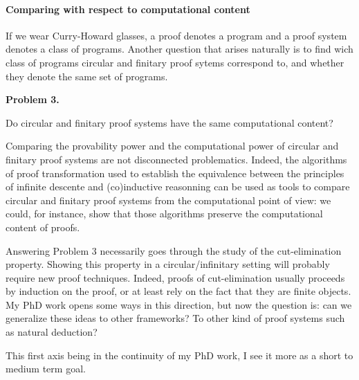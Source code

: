 \documentclass[11pt,twocolumn]{article}
\begin{document}
\paragraph{Comparing with respect to computational content}

If we wear Curry-Howard glasses, a proof denotes a program and a proof system denotes a class
of programs. Another question that arises naturally is to find wich class of programs circular and finitary proof sytems correspond to, and whether they denote the same set of programs.
 
\begin{center}
\begin{bclogo}[logo= ,arrondi = 0.1, couleur = green!10,  epBarre = 0]{}
  \vspace{-10pt}
  \textbf{Problem 3.}

Do circular and finitary proof systems have the same computational content?
\end{bclogo}
\end{center}

Comparing the provability power and the computational power of  circular and finitary proof systems are not disconnected problematics. Indeed, the algorithms of proof transformation used to establish the equivalence between the principles of infinite descente and (co)inductive reasonning can be used as tools to compare circular and finitary proof systems from the computational point of view: we could, for instance, show that those algorithms preserve the computational content of proofs.   


\smallskip

Answering Problem 3 necessarily goes through the study of the cut-elimination property.
Showing this property in a circular/infinitary setting will probably require new proof techniques. Indeed, proofs of cut-elimination usually proceeds by induction on the proof, or at least rely on the fact that they are finite objects. 
My PhD work opens some ways in this direction, but now the question is: can we generalize these ideas to other frameworks? To other kind of proof systems such as natural deduction? 


\bigskip

This first axis being in the continuity of my PhD work, I see it more as a short to medium term goal.
  




\end{document}
